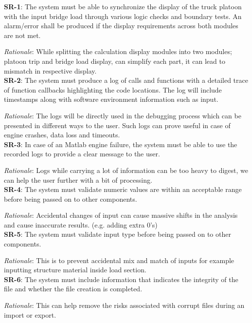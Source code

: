 \documentclass{article}
\begin{document}
\textbf{SR-1}:
The system must be able to synchronize the display of the truck platoon with the input bridge load through various logic checks and boundary tests. An alarm/error shall be produced if the display requirements across both modules are not met. 

\emph{Rationale}: While splitting the calculation display modules into two modules; platoon trip and bridge load display, can simplify each part, it can lead to mismatch in respective display.\\

\textbf{SR-2}: 
The system must produce a log of calls and functions with a detailed trace of function callbacks highlighting the code locations. The log will include timestamps along with software environment information such as input.

\emph{Rationale}:
The logs will be directly used in the debugging process which can be presented in different ways to the user. Such logs can prove useful in case of engine crashes, data loss and timeouts. \\

\textbf{SR-3}:
In case of an Matlab engine failure, the system must be able to use the recorded logs to provide a clear message to the user.

\emph{Rationale}: Logs while carrying a lot of information can be too heavy to digest, we can help the user further with a bit of processing.\\ 

\textbf{SR-4}:
The system must validate numeric values are within an acceptable range before being passed on to other components.

\emph{Rationale}: Accidental changes of input can cause massive shifts in the analysis and cause inaccurate results. (e.g. adding extra 0’s) \\

\textbf{SR-5}:
The system must validate input type before being passed on to other components.

\emph{Rationale}: This is to prevent accidental mix and match of inputs for example inputting structure material inside load section.\\

\textbf{SR-6}:
The system must include information that indicates the integrity of the file and whether the file creation is completed.

\emph{Rationale}: This can help remove the risks associated with corrupt files during an import or export. \\
\end{document}

